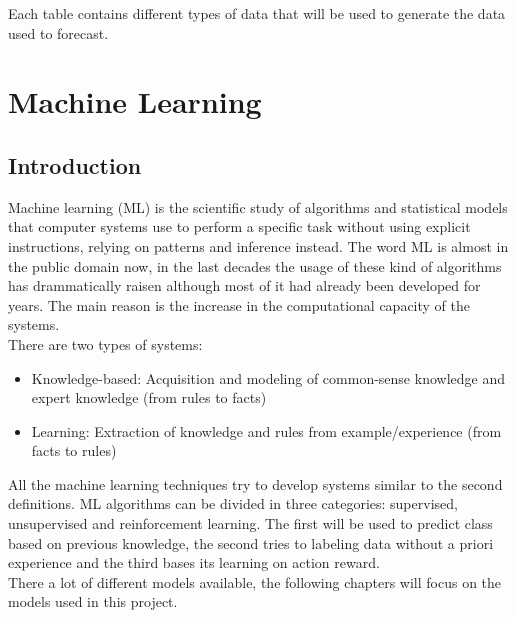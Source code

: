 \documentclass[%
    corpo=12pt,
    twoside,
    oldstyle,
    autoretitolo,
    greek,
    evenboxes,
]{toptesi}
\begin{document}
Each table contains different types of data that will be used to generate the data used to forecast.


\chapter{Machine Learning}
\label{chap:ml}
\section{Introduction}
Machine learning (ML) is the scientific study of algorithms and statistical models that computer systems use to perform a specific task without using explicit instructions, relying on patterns and inference instead. The word ML is almost in the public domain now, in the last decades the usage of these kind of algorithms has drammatically raisen although most of it had already been developed for years. The main reason is the increase in the computational capacity of the systems.\\
There are two types of systems:
\begin{itemize}
  \item Knowledge-based: Acquisition and modeling of common-sense knowledge and expert knowledge (from rules to facts)
  \item Learning: Extraction of knowledge and rules from example/experience (from facts to rules)
\end{itemize}
All the machine learning techniques try to develop systems similar to the second definitions. ML algorithms can be divided in three categories: supervised, unsupervised and reinforcement learning. The first will be used to predict class based on previous knowledge, the second tries to labeling data without a priori experience and the third bases its learning on action reward.\\
There a lot of different models available, the following chapters will focus on the models used in this project.
\end{document}
